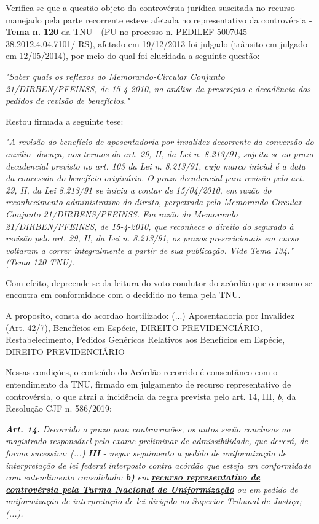 \documentclass[12pt]{article}
\begin{document}
\justifying
\noindent Verifica-se que a questão objeto da controvérsia jurídica suscitada no recurso manejado pela parte recorrente esteve afetada no representativo da controvérsia - \textbf{Tema n. }\textbf{120} da TNU - (PU no processo n. PEDILEF 5007045-38.2012.4.04.7101/ RS),  afetado em 19/12/2013 foi julgado (trânsito em julgado em 12/05/2014), por meio do qual foi elucidada a seguinte questão:

\noindent \textit{"Saber quais os reflexos do Memorando-Circular Conjunto 21/DIRBEN/PFEINSS, de 15-4-2010, na análise da prescrição e decadência dos pedidos de revisão de benefícios."}

\noindent Restou firmada a seguinte tese:

\noindent \textit{"A revisão do benefício de aposentadoria por invalidez decorrente da conversão do auxílio- doença, nos termos do art. 29, II, da Lei n. 8.213/91, sujeita-se ao prazo decadencial previsto no art. 103 da Lei n. 8.213/91, cujo marco inicial é a data da concessão do benefício originário. O prazo decadencial para revisão pelo art. 29, II, da Lei 8.213/91 se inicia a contar de 15/04/2010, em razão do reconhecimento administrativo do direito, perpetrada pelo Memorando-Circular Conjunto 21/DIRBENS/PFEINSS. Em razão do Memorando 21/DIRBEN/PFEINSS, de 15-4-2010, que reconhece o direito do segurado à revisão pelo art. 29, II, da Lei n. 8.213/91, os prazos prescricionais em curso voltaram a correr integralmente a partir de sua publicação. Vide Tema 134." (Tema 120 TNU).}

\noindent Com efeito, depreende-se da leitura do voto condutor do acórdão que o mesmo se encontra em conformidade com o decidido no  tema pela TNU.

\noindent A proposito, consta do acordao hostilizado: (...) Aposentadoria por Invalidez (Art. 42/7), Benefícios em Espécie, DIREITO PREVIDENCIÁRIO, Restabelecimento, Pedidos Genéricos Relativos aos Benefícios em Espécie, DIREITO PREVIDENCIÁRIO

\noindent Nessas condições, o conteúdo do Acórdão recorrido é consentâneo com o entendimento da TNU, firmado em julgamento de recurso representativo de controvérsia, o que atrai a incidência da regra prevista pelo art. 14, III, \textit{b,} da Resolução CJF n. 586/2019:

\noindent \textit{\textbf{Art. 14.}}\textit{ Decorrido o prazo para contrarrazões, os autos serão conclusos ao magistrado responsável pelo exame preliminar de admissibilidade, que deverá, de forma sucessiva: (...) }\textit{\textbf{III }}\textit{- negar seguimento a pedido de uniformização de interpretação de lei federal interposto contra acórdão que esteja em conformidade com entendimento consolidado: }\textit{\textbf{b)}}\textit{ em }\uline{\textit{\textbf{recurso representativo de controvérsia pela Turma Nacional de Uniformização}}}\textit{ ou em pedido de uniformização de interpretação de lei dirigido ao Superior Tribunal de Justiça;(...).}
\end{document}
